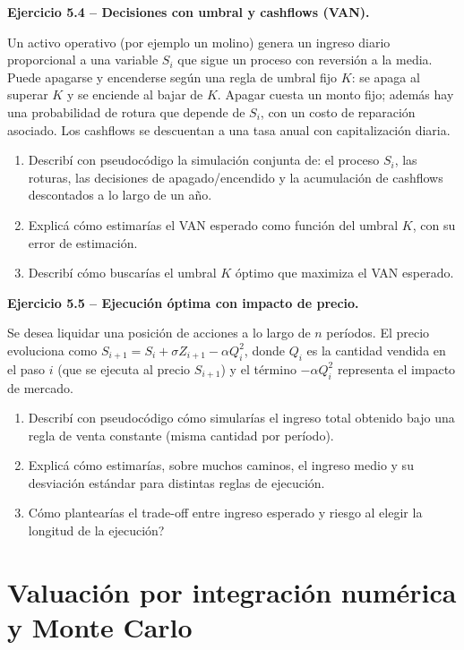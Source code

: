 \documentclass[11pt,a4paper]{article}
\newcommand{\ejercicio}[1]{\par\medskip\noindent\textbf{#1}\par\nopagebreak\smallskip}
\begin{document}
\ejercicio{Ejercicio 5.4 -- Decisiones con umbral y cashflows (VAN).}
Un activo operativo (por ejemplo un molino) genera un ingreso diario proporcional
a una variable $S_i$ que sigue un proceso con reversi\'on a la media. Puede
apagarse y encenderse seg\'un una regla de umbral fijo $K$: se apaga al superar $K$
y se enciende al bajar de $K$. Apagar cuesta un monto fijo; adem\'as hay una
probabilidad de rotura que depende de $S_i$, con un costo de reparaci\'on asociado.
Los cashflows se descuentan a una tasa anual con capitalizaci\'on diaria.
\begin{enumerate}[label=(\alph*)]
  \item Describ\'i con pseudoc\'odigo la simulaci\'on conjunta de: el proceso $S_i$, las
        roturas, las decisiones de apagado/encendido y la acumulaci\'on de cashflows
        descontados a lo largo de un a\~no.
  \item Explic\'a c\'omo estimar\'ias el VAN esperado como funci\'on del umbral $K$, con
        su error de estimaci\'on.
  \item Describ\'i c\'omo buscar\'ias el umbral $K$ \'optimo que maximiza el VAN esperado.
\end{enumerate}

\ejercicio{Ejercicio 5.5 -- Ejecuci\'on \'optima con impacto de precio.}
Se desea liquidar una posici\'on de acciones a lo largo de $n$ per\'iodos. El precio
evoluciona como $S_{i+1}=S_i+\sigma Z_{i+1}-\alpha Q_i^2$, donde $Q_i$ es la
cantidad vendida en el paso $i$ (que se ejecuta al precio $S_{i+1}$) y el t\'ermino
$-\alpha Q_i^2$ representa el impacto de mercado.
\begin{enumerate}[label=(\alph*)]
  \item Describ\'i con pseudoc\'odigo c\'omo simular\'ias el ingreso total obtenido bajo
        una regla de venta constante (misma cantidad por per\'iodo).
  \item Explic\'a c\'omo estimar\'ias, sobre muchos caminos, el ingreso medio y su
        desviaci\'on est\'andar para distintas reglas de ejecuci\'on.
  \item \textquestiondown{}C\'omo plantear\'ias el trade-off entre ingreso esperado y riesgo al elegir
        la longitud de la ejecuci\'on?
\end{enumerate}

\section{Valuaci\'on por integraci\'on num\'erica y Monte Carlo}
\end{document}
